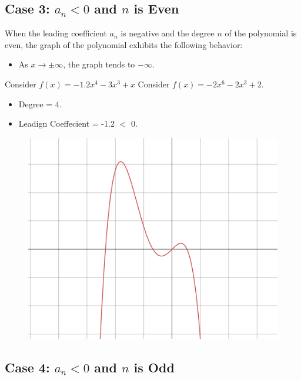 \subsection*{Case 3: \( a_n < 0 \) and \(n\) is Even}


When the leading coefficient \( a_n \) is negative and the degree \( n \) of the polynomial is even, the graph of the polynomial exhibits the following behavior:

\begin{itemize}
    \item As \( x \to \pm \infty \), the graph tends to \( - \infty \).
\end{itemize}


\begin{example}
Consider \( f(x) =-1.2x^{4}-3x^{3}+x\)
  Consider   \( f(x) = -2x^6 - 2x^3 + 2 \).
  \begin{itemize}
  \item Degree = 4.
  \item Leadign Coeffecient = -1.2 $<$ 0.
  \end{itemize}


\begin{figure}[H]
  \centering
  \includegraphics[scale=0.2]{"./fig/case_2.png"}
\end{figure}
\end{example}

\subsection*{Case 4: \( a_n < 0 \) and \(n\) is Odd}

